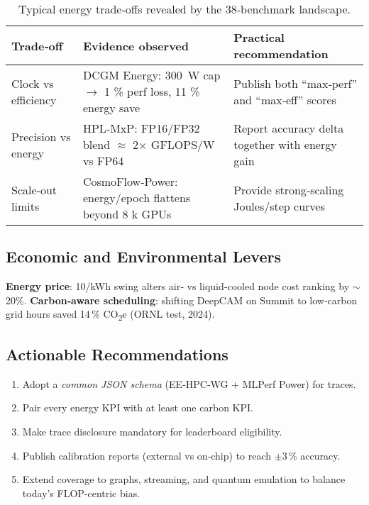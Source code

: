 \begin{table}[ht]
  \centering
  \caption{Typical energy trade‑offs revealed by the 38‑benchmark landscape.}
  \label{tab:tradeoffs}
  \footnotesize
  \renewcommand{\arraystretch}{1.05}
  \setlength{\tabcolsep}{3pt}
  \begin{tabularx}{\columnwidth}{@{} l X X @{}}
    \toprule
    \textbf{Trade‑off} & \textbf{Evidence observed} & \textbf{Practical recommendation} \\ \midrule
    Clock vs efficiency & DCGM Energy: \SI{300}{\watt} cap $\rightarrow$ 1 \% perf loss, 11 \% energy save & Publish both ``max‑perf'' and ``max‑eff'' scores \\ 
    Precision vs energy & HPL‑MxP: FP16/FP32 blend $\approx$ 2× GFLOPS/W vs FP64 & Report accuracy delta together with energy gain \\ 
    Scale‑out limits    & CosmoFlow‑Power: energy/epoch flattens beyond 8 k GPUs & Provide strong‑scaling Joules/step curves \\ \bottomrule
  \end{tabularx}
\end{table}


\subsection{Economic and Environmental Levers}

\vspace{2pt}
\noindent
\textbf{Energy price}: \SI{10}{\cent}/kWh swing alters air‑ vs liquid‑cooled
node cost ranking by $\sim$20\%.  
\textbf{Carbon‑aware scheduling}: shifting DeepCAM on Summit to low‑carbon grid
hours saved 14\,\% CO\textsubscript{2}e (ORNL test, 2024).  

\subsection{Actionable Recommendations}

\begin{enumerate}
  \item Adopt a \emph{common JSON schema} (EE‑HPC‑WG + MLPerf Power) for traces.
  \item Pair every energy KPI with at least one carbon KPI.
  \item Make trace disclosure mandatory for leaderboard eligibility.
  \item Publish calibration reports (external vs on‑chip) to reach
        $\pm$3\,\% accuracy.
  \item Extend coverage to graphs, streaming, and quantum emulation
        to balance today’s FLOP‑centric bias.
\end{enumerate}

